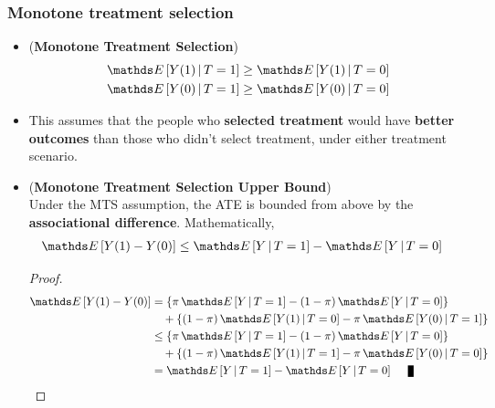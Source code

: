\documentclass[11pt]{article}
\begin{document}
\subsubsection{Monotone treatment selection}
\begin{itemize}
\item \begin{assumption} (\textbf{Monotone Treatment Selection}) \citep{neal2020introduction} \\
\begin{align}
\E{}{Y(1) \,|\, T=1}  &\ge \E{}{Y(1) \,|\, T=0} \nonumber\\
\E{}{Y(0) \,|\, T=1}  &\ge \E{}{Y(0) \,|\, T=0} \label{eqn: mts_assumption}
\end{align}
\end{assumption}

\item This assumes that the people who \textbf{\textbf{selected treatment}} would have \textbf{better outcomes} than those who didn’t select treatment, under either treatment scenario.  

\item \begin{proposition} (\textbf{Monotone Treatment Selection Upper Bound})  \citep{neal2020introduction}\\
Under the MTS assumption, the ATE is bounded from above by the \textbf{associational difference}. Mathematically,
\begin{align}
\E{}{Y(1) - Y(0)}  &\le \E{}{Y\,|\, T = 1} -  \E{}{Y\,|\, T = 0}  \label{eqn: mts_upper_bound}
\end{align}
\end{proposition}
\begin{proof}
\begin{align*}
\E{}{Y(1) - Y(0)}  &=  \set{\pi\, \E{}{Y \,|\, T = 1} - (1-\pi)\, \E{}{Y\,|\, T=0}}   \nonumber\\
&\quad +  \set{(1-\pi)\, \E{}{Y(1) \,|\, T=0 } - \pi\, \E{}{Y(0) \,|\, T=1} } \\
&\le  \set{\pi\, \E{}{Y \,|\, T = 1} - (1-\pi)\, \E{}{Y\,|\, T=0}}   \nonumber\\
&\quad +  \set{(1-\pi)\, \E{}{Y(1) \,|\, T=1 } - \pi\, \E{}{Y(0) \,|\, T=0} } \\
&= \E{}{Y \,|\, T = 1} - \E{}{Y\,|\, T=0} \qed
\end{align*}
\end{proof}
\end{itemize}
\end{document}
